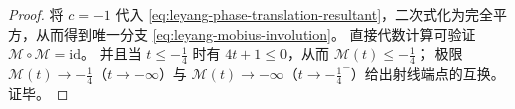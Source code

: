 \begin{proof}
将 \(c=-1\) 代入 \eqref{eq:leyang-phase-translation-resultant}，二次式化为完全平方，从而得到唯一分支 \eqref{eq:leyang-mobius-involution}。
直接代数计算可验证 \(\mathscr{M}\circ\mathscr{M}=\mathrm{id}\)。
并且当 \(t\le -\tfrac14\) 时有 \(4t+1\le 0\)，从而 \(\mathscr{M}(t)\le -\tfrac14\)；
极限 \(\mathscr{M}(t)\to-\tfrac14\)（\(t\to-\infty\)）与 \(\mathscr{M}(t)\to-\infty\)（\(t\to-\tfrac14^-\)）给出射线端点的互换。证毕。
\end{proof}

\endinput

